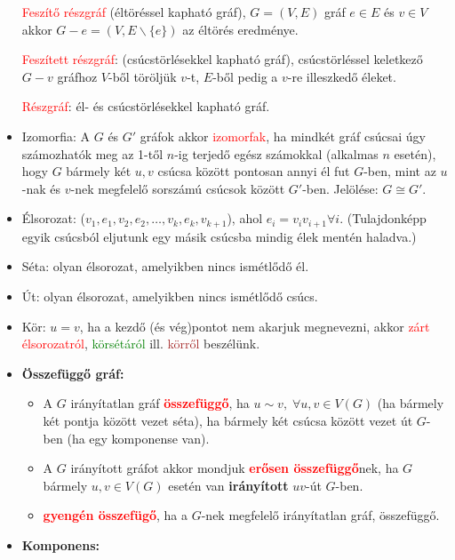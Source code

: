 \documentclass[../../szobeli.tex]{subfiles}
\begin{document}
\begin{itemize}
        \textcolor{red}{Feszítő részgráf} (éltöréssel kapható gráf), $G=(V,E)$ gráf $e \in E$ és $v \in V$ akkor $G-e=(V,E \backslash \{e\})$ az éltörés eredménye. 
        
        \textcolor{red}{Feszített részgráf}: (csúcstörlésekkel kapható gráf), csúcstörléssel keletkező $G-v$ gráfhoz $V$-ből töröljük $v$-t, $E$-ből pedig a $v$-re illeszkedő éleket. 
        
        \textcolor{red}{Részgráf}: él- és csúcstörlésekkel kapható gráf. 

        \item Izomorfia: A $G$ és $G'$ gráfok akkor \textcolor{red}{izomorfak}, ha mindkét gráf csúcsai úgy számozhatók meg az 1-től $n$-ig terjedő egész számokkal (alkalmas $n$ esetén), hogy $G$ bármely két $u,v$ csúcsa között pontosan annyi él fut $G$-ben, mint az $u$-nak és $v$-nek megfelelő sorszámú csúcsok között $G'$-ben. Jelölése: $G \cong G'$.
        \item Élsorozat: ($v_1,e_1,v_2,e_2,\dots,v_k,e_k,v_{k+1}$), ahol $e_i=v_i v_{i+1}\forall i$. (Tulajdonképp egyik csúcsból eljutunk egy másik csúcsba mindig élek mentén haladva.)
        \item Séta: olyan élsorozat, amelyikben nincs ismétlődő él. 	
        \item Út: olyan élsorozat, amelyikben nincs ismétlődő csúcs.
        \item Kör: $u = v$, ha a kezdő (és vég)pontot nem akarjuk megnevezni, akkor \textcolor{red}{zárt élsorozatról}, \textcolor{green}{körsétáról} ill. \textcolor{brown}{körről} beszélünk.
        \item \textbf{Összefüggő gráf:} \begin{itemize}
            \item A $G$ irányítatlan gráf \textcolor{red}{\textbf{összefüggő}}, ha $u \sim v, \;\forall u,v \in V(G)$ (ha bármely két pontja között vezet séta), ha bármely két csúcsa között vezet út $G$-ben (ha egy komponense van).
            \item A $G$ irányított gráfot akkor mondjuk \textcolor{red}{\textbf{erősen összefüggő}}nek, ha $G$ bármely $u,v \in V(G) $ esetén van \textbf{irányított} $uv$-út $G$-ben.
            \item \textcolor{red}{\textbf{gyengén összefügő}}, ha a $G$-nek megfelelő irányítatlan gráf, összefüggő.
        \end{itemize}
        \item \textbf{Komponens:} \begin{itemize}

\end{itemize}
\end{itemize}
\end{document}
